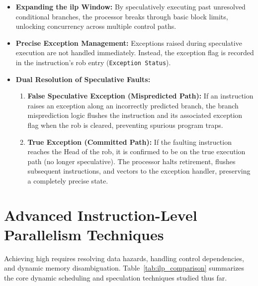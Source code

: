 \begin{itemize}
    \item \textbf{Expanding the \gls{ilp} Window:} By speculatively executing past unresolved conditional branches, the processor breaks through basic block limits, unlocking concurrency across multiple control paths.
    \item \textbf{Precise Exception Management:} Exceptions raised during speculative execution are not handled immediately. Instead, the exception flag is recorded in the instruction's \gls{rob} entry (\texttt{Exception Status}).
    \item \textbf{Dual Resolution of Speculative Faults:}
    \begin{enumerate}
        \item \textbf{False Speculative Exception (Mispredicted Path):} If an instruction raises an exception along an incorrectly predicted branch, the branch misprediction logic flushes the instruction and its associated exception flag when the \gls{rob} is cleared, preventing spurious program traps.
        \item \textbf{True Exception (Committed Path):} If the faulting instruction reaches the Head of the \gls{rob}, it is confirmed to be on the true execution path (no longer speculative). The processor halts retirement, flushes subsequent instructions, and vectors to the exception handler, preserving a completely precise state.
    \end{enumerate}
\end{itemize}


\section{Advanced Instruction-Level Parallelism Techniques}
\label{sec:advanced_ilp_techniques}

Achieving high  requires resolving data hazards, handling control dependencies, and dynamic memory disambiguation. Table~\ref{tab:ilp_comparison} summarizes the core dynamic scheduling and speculation techniques studied thus far.

